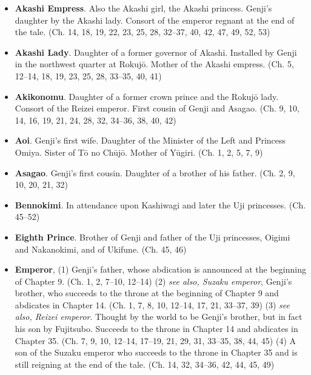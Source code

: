 \documentclass{article}
\begin{document}
\setlength{\columnsep}{5em}
\begin{multicols}{2}

	\begin{small}%
	\begin{itemize}[
			label=,
			leftmargin=0em,
			rightmargin=-1.5em,
			itemindent=-2em,
			nosep,
		]
		\setlength{\itemsep}{0.15em}

		\item \textbf{Akashi Empress}. Also the Akashi girl, the Akashi princess. Genji's daughter by the Akashi lady. Consort of the emperor regnant at the end of the tale. (Ch. 14, 18, 19, 22, 23, 25, 28, 32--37, 40, 42, 47, 49, 52, 53)

		\item \textbf{Akashi Lady}. Daughter of a former governor of Akashi. Installed by Genji in the northwest quarter at Rokujō. Mother of the Akashi empress. (Ch. 5, 12--14, 18, 19, 23, 25, 28, 33--35, 40, 41)

		\item \textbf{Akikonomu}. Daughter of a former crown prince and the Rokujō lady. Consort of the Reizei emperor. First cousin of Genji and Asagao. (Ch. 9, 10, 14, 16, 19, 21, 24, 28, 32, 34--36, 38, 40, 42)

		\item \textbf{Aoi}. Genji's first wife. Daughter of the Minister of the Left and Princess Omiya. Sister of Tō no Chūjō. Mother of Yūgiri. (Ch. 1, 2, 5, 7, 9)

		\item \textbf{Asagao}. Genji's first cousin. Daughter of a brother of his father. (Ch. 2, 9, 10, 20, 21, 32)

		\item \textbf{Bennokimi}. In attendance upon Kashiwagi and later the Uji princesses. (Ch. 45--52)

		\item \textbf{Eighth Prince}. Brother of Genji and father of the Uji princesses, Oigimi and Nakanokimi, and of Ukifune. (Ch. 45, 46)

		\item \textbf{Emperor}, (1) Genji's father, whose abdication is announced at the beginning of Chapter 9. (Ch. 1, 2, 7--10, 12--14)
		      (2) \textit{see also, Suzaku emperor}, Genji's brother, who succeeds to the throne at the beginning of Chapter 9 and abdicates in Chapter 14. (Ch. 1, 7, 8, 10, 12--14, 17, 21, 33--37, 39)
		      (3) \textit{see also, Reizei emperor}. Thought by the world to be Genji's brother, but in fact his son by Fujitsubo. Succeeds to the throne in Chapter 14 and abdicates in Chapter 35. (Ch. 7, 9, 10, 12--14, 17--19, 21, 29, 31, 33--35, 38, 44, 45)
		      (4) A son of the Suzaku emperor who succeeds to the throne in Chapter 35 and is still reigning at the end of the tale. (Ch. 14, 32, 34--36, 42, 44, 45, 49)


\end{itemize}
\end{small}
\end{multicols}
\end{document}
